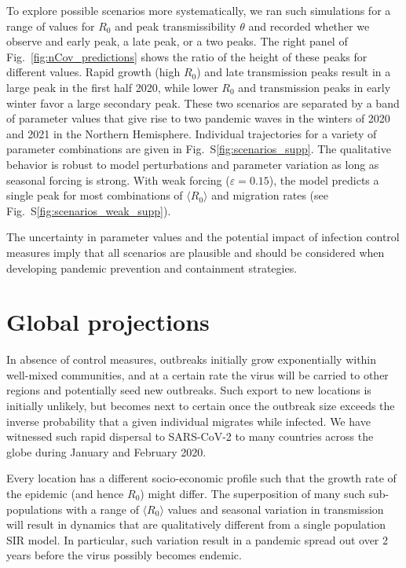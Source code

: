 \documentclass[rmp, reprint, superscriptaddress, floatfix,amsmath]{revtex4-1}
\newcommand{\forcing}{\varepsilon}
\begin{document}
To explore possible scenarios more systematically, we ran such simulations for a range of values for $R_0$ and peak transmissibility $\theta$ and recorded whether we observe and early peak, a late peak, or a two peaks. 
The right panel of Fig.~\ref{fig:nCov_predictions} shows the ratio of the height of these peaks for different values.
Rapid growth (high $R_0$) and late transmission peaks result in a large peak in the first half 2020, while lower $R_0$ and transmission peaks in early winter favor a large secondary peak. 
These two scenarios are separated by a band of parameter values that give rise to two pandemic waves in the winters of 2020 and 2021 in the Northern Hemisphere.
Individual trajectories for a variety of parameter combinations are given in Fig.~S\ref{fig:scenarios_supp}.
The qualitative behavior is robust to model perturbations and parameter variation as long as seasonal forcing is strong. 
With weak forcing ($\forcing=0.15$), the model predicts a single peak for most combinations of $\langle R_0 \rangle$ and migration rates (see Fig.~S\ref{fig:scenarios_weak_supp}).

The uncertainty in parameter values and the potential impact of infection control measures imply that all scenarios are plausible and should be considered when developing pandemic prevention and containment strategies.


\section{Global projections}
In absence of control measures, outbreaks initially grow exponentially within well-mixed communities, and at a certain rate the virus will be carried to other regions and potentially seed new outbreaks. 
Such export to new locations is initially unlikely, but becomes next to certain once the outbreak size exceeds the inverse probability that a given individual migrates while infected.
We have witnessed such rapid dispersal to SARS-CoV-2 to many countries across the globe during January and February 2020.

Every location has a different socio-economic profile such that the growth rate of the epidemic (and hence $R_0$) might differ. 
The superposition of many such sub-populations with a range of $\langle R_0 \rangle$ values and seasonal variation in transmission will result in dynamics that are qualitatively different from a single population SIR model. 
In particular, such variation result in a pandemic spread out over 2 years before the virus possibly becomes endemic. 
\end{document}
